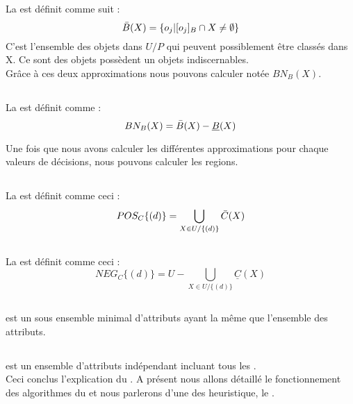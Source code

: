 \subsection{\bupper}
La \bupper est définit comme suit :
\begin{equation}
    \Bar{B}(X) = \{o_j | [o_j]_B \cap X \neq \emptyset\}
\end{equation}
C'est l'ensemble des objets dans
$U/P$ qui peuvent possiblement être classés dans X. Ce sont des objets
possèdent un objets indiscernables. \\

Grâce à ces deux approximations nous pouvons calculer \bboundary
notée $BN_B(X)$.

\subsection{\bboundary}
La \bboundary est définit comme :
\begin{equation}
    BN_B(X) = \Bar{B}(X) - \underline{B}(X)
\end{equation}

Une fois que nous avons calculer les différentes approximations pour
chaque valeurs de décisions, nous pouvons calculer les regions.

\subsection{\posreg}
La \posreg est définit comme ceci :
\begin{equation}
    POS_C\{(d)\} = \bigcup_{X \in U/\{(d)\}} \Bar{C}(X)
\end{equation}

\subsection{\negreg}
La \negreg est définit comme ceci :
\begin{equation}
    NEG_C\{(d)\} = U - \bigcup_{X \in U/\{(d)\}} \underline{C}(X)
\end{equation}

\subsection{\reduct}
\reduct est un sous ensemble minimal d'attributs ayant la même
\posreg que l'ensemble des attributs.

\subsection{\core}
\core est un ensemble d'attributs indépendant incluant tous les
\reduct. \\

\noindent
Ceci conclus l'explication du \rst. A présent nous allons détaillé
le fonctionnement des algorithmes du \rst et nous parlerons d'une
des heuristique, le \quickreduct.